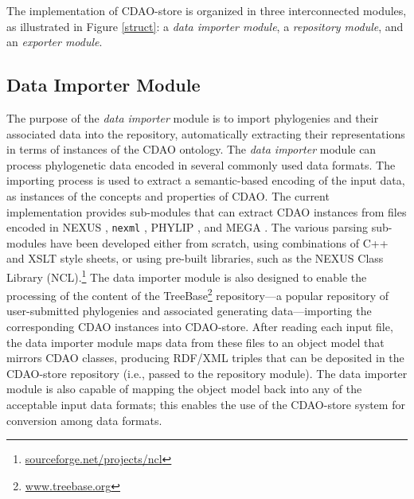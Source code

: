 \documentclass[10pt]{bmc_article}
\newenvironment{bmcformat}{\fussy\setboolean{publ}{true}}{\fussy}
\begin{document}
\begin{bmcformat}
The implementation of CDAO-store is organized in three interconnected
modules, as illustrated in Figure \ref{struct}:
a \emph{data importer module}, a \emph{repository module}, and
an  \emph{exporter module}. 

\subsection*{Data Importer Module}
The purpose of the \emph{data importer} module is to import phylogenies and
their associated data into the repository, automatically extracting their representations
in terms of instances of the CDAO ontology.
The \emph{data importer} module can process phylogenetic data encoded in several 
commonly 
used data formats. The importing process is used to extract a semantic-based encoding
of the input data, as instances of the concepts and properties of CDAO. The current 
implementation provides sub-modules that can extract CDAO instances from files 
encoded in NEXUS \cite{nexus}, {\tt nexml} \cite{nexml}, PHYLIP \cite{phylip}, and
MEGA \cite{mega}.
The various parsing sub-modules have been developed either from scratch, using
combinations of C++ and XSLT style sheets, or using pre-built libraries, such as
the NEXUS Class Library (NCL).\footnote{\url{sourceforge.net/projects/ncl}}
The data importer module is also designed to enable the processing of the 
content of the TreeBase\footnote{\url{www.treebase.org}} repository---a popular repository of user-submitted phylogenies
and associated generating data---importing the corresponding CDAO instances
into CDAO-store.
After reading each input file, 
the data importer module maps data from these files to an object model that mirrors 
CDAO classes, producing RDF/XML triples that can be deposited in the CDAO-store
repository (i.e., passed to the repository module). The data importer module is also capable
of mapping the object model back into any of the acceptable input data formats; this enables
the use of the CDAO-store system for conversion among data formats.


\end{bmcformat}
\end{document}
